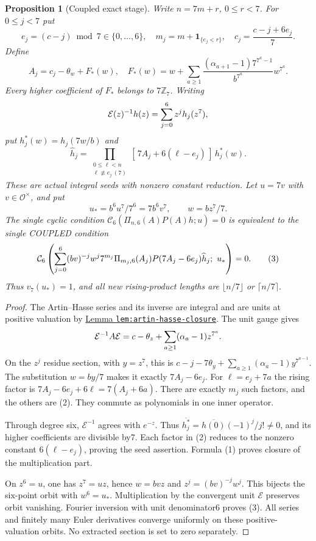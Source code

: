 \documentclass[11pt]{article}
\newtheorem{proposition}[lemma]{Proposition}
\begin{document}
\begin{proposition}[Coupled exact stage]\label{prop:stage}
Write $n=7m+r$, $0\le r<7$. For $0\le j<7$ put
\[
 e_j=(c-j)\bmod7\in\{0,\ldots,6\},\quad
 m_j=m+\boldsymbol1_{\{e_j<r\}},\quad
 c_j=\frac{c-j+6e_j}{7}.
\]
Define
\[
 A_j=c_j-\theta_w+F_*(w),\quad
 F_*(w)=w+\sum_{a\ge1}
 \frac{(\alpha_{a+1}-1)7^{7^a-1}}{b^{7^a}}w^{7^a}.       \tag{1}
\]
Every higher coefficient of $F_*$ belongs to $7\mathbb Z_7$.
Writing
\[
 {\cal E}(z)^{-1}h(z)=\sum_{j=0}^6z^j h_j(z^7),
\]
put $h_j^*(w)=h_j(7w/b)$ and
\[
 \widehat h_j=
 \prod_{\substack{0\le\ell<n\\\ell\not\equiv e_j\ (7)}}
       [\,7A_j+6(\ell-e_j)\,]\,h_j^*(w).                 \tag{2}
\]
These are actual integral seeds with nonzero constant reduction.
Let $u=7v$ with $v\in\mathcal O^\times$, and put
\[
 u_*=b^6u^7/7^6=7b^6v^7,\qquad w=bz^7/7 .
\]
The single cyclic condition
$\mathcal C_6(\Pi_{n,6}(A)P(A)h;u)=0$
is equivalent to the single COUPLED condition
\[
 {\cal C}_6\left(
 \sum_{j=0}^6(bv)^{-j}w^j7^{m_j}
       \Pi_{m_j,6}(A_j)
       P(7A_j-6e_j)\widehat h_j;\ u_*\right)=0.           \tag{3}
\]
Thus $v_7(u_*)=1$, and all new rising-product lengths are
$\lfloor n/7\rfloor$ or $\lceil n/7\rceil$.
\end{proposition}
\begin{proof}
The Artin--Hasse series and its inverse are integral and are units
at positive valuation by
\href{ARITHMETIC_FRONTIER_TERMINAL_ORDERS.tex}
{Lemma \texttt{lem:artin-hasse-closure}}.
The unit gauge gives
\[
 {\cal E}^{-1}A{\cal E}
       =c-\theta_z+\sum_{a\ge1}(\alpha_a-1)z^{7^a}.
\]
On the $z^j$ residue section, with $y=z^7$, this is
$c-j-7\theta_y+\sum_{a\ge1}(\alpha_a-1)y^{7^{a-1}}$.
The substitution $w=by/7$ makes it exactly $7A_j-6e_j$.
For $\ell=e_j+7a$ the rising factor is
$7A_j-6e_j+6\ell=7(A_j+6a)$.
There are exactly $m_j$ such factors, and the others are (2).
They commute as polynomials in one inner operator.

Through degree six, $\mathcal E^{-1}$ agrees with $e^{-z}$.
Thus $\overline{h_j^*}=\overline{h(0)}(-1)^j/j!\ne0$,
and its higher coefficients are divisible by7.
Each factor in (2) reduces to the nonzero constant
$6(\ell-e_j)$, proving the seed assertion.
Formula (1) proves closure of the multiplication part.

On $z^6=u$, one has $z^7=uz$, hence $w=bvz$ and
$z^j=(bv)^{-j}w^j$. This bijects the six-point orbit with
$w^6=u_*$.
Multiplication by the convergent unit $\mathcal E$ preserves orbit
vanishing. Fourier inversion with unit denominator6 proves (3).
All series and finitely many Euler derivatives converge uniformly
on these positive-valuation orbits. No extracted section is
set to zero separately.
\end{proof}
\end{document}
